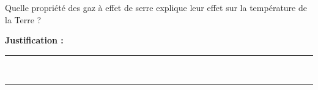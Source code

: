 Quelle propriété des gaz à effet de serre explique leur effet sur la température de la Terre ?

\choices

\noindent\textbf{Justification :} \hrulefill \\[2.5ex]
\rule{\linewidth}{0.4pt} \\[2.5ex]
\rule{\linewidth}{0.4pt}
\vfill
